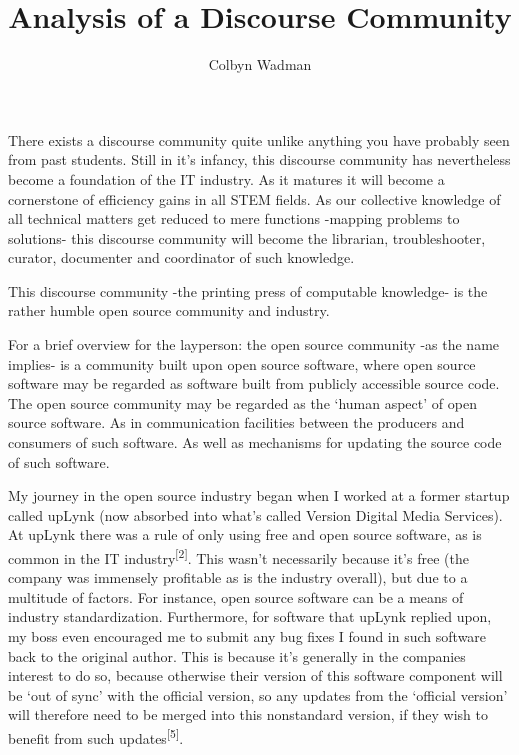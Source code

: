 \documentclass[american, 12pt]{article}
\begin{document}
\title{Analysis of a Discourse Community}
\author{Colbyn Wadman}
\maketitle



There exists a discourse community quite unlike anything you have probably seen from past students. Still in it’s infancy, this discourse community has nevertheless become a foundation of the IT industry. As it matures it will become a cornerstone of efficiency gains in all STEM fields. As our collective knowledge of all technical matters get reduced to mere functions -mapping problems to solutions- this discourse community will become the librarian, troubleshooter, curator, documenter and coordinator of such knowledge.

This discourse community -the printing press of computable knowledge- is the rather humble open source community and industry.

For a brief overview for the layperson: the open source community -as the name implies- is a community built upon open source software, where open source software may be regarded as software built from publicly accessible source code. The open source community may be regarded as the ‘human aspect’ of open source software. As in communication facilities between the producers and consumers of such software. As well as mechanisms for updating the source code of such software.

My journey in the open source industry began when I worked at a former startup called upLynk (now absorbed into what's called Version Digital Media Services). At upLynk there was a rule of only using free and open source software, as is common in the IT industry\textsuperscript{[2]}. This wasn’t necessarily because it’s free (the company was immensely profitable as is the industry overall), but due to a multitude of factors. For instance, open source software can be a means of industry standardization. Furthermore, for software that upLynk replied upon, my boss even encouraged me to submit any bug fixes I found in such software back to the original author. This is because it’s generally in the companies interest to do so, because otherwise their version of this software component will be ‘out of sync’ with the official version, so any updates from the ‘official version’ will therefore need to be merged into this nonstandard version, if they wish to benefit from such updates\textsuperscript{[5]}.
\end{document}
